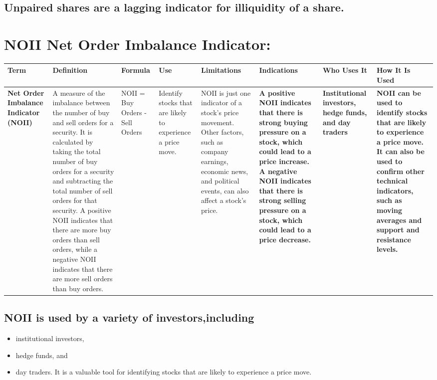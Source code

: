\documentclass[11pt]{article}
\begin{document}
\subsection{Unpaired shares are a lagging indicator for illiquidity of a share.}
\label{sec:org0ca7429}

\section{NOII Net Order Imbalance Indicator:}
\label{sec:org6dc8358}

\begin{center}
\begin{tabular}{llllllll}
\textbf{\textbf{Term}} & \textbf{\textbf{Definition}} & \textbf{\textbf{Formula}} & \textbf{\textbf{Use}} & \textbf{\textbf{Limitations}} & \textbf{\textbf{Indications}} & \textbf{\textbf{Who Uses It}} & \textbf{\textbf{How It Is Used}}\\[0pt]
\hline
\textbf{\textbf{Net Order Imbalance Indicator (NOII)}} & A measure of the imbalance between the number of buy and sell orders for a security. It is calculated by taking the total number of buy orders for a security and subtracting the total number of sell orders for that security. A positive NOII indicates that there are more buy orders than sell orders, while a negative NOII indicates that there are more sell orders than buy orders. & NOII = Buy Orders - Sell Orders & Identify stocks that are likely to experience a price move. & NOII is just one indicator of a stock's price movement. Other factors, such as company earnings, economic news, and political events, can also affect a stock's price. & \textbf{\textbf{A positive NOII indicates that there is strong buying pressure on a stock, which could lead to a price increase. A negative NOII indicates that there is strong selling pressure on a stock, which could lead to a price decrease.}} & \textbf{\textbf{Institutional investors, hedge funds, and day traders}} & \textbf{\textbf{NOII can be used to identify stocks that are likely to experience a price move. It can also be used to confirm other technical indicators, such as moving averages and support and resistance levels.}}\\[0pt]
\end{tabular}
\end{center}

\subsection{NOII is used by a variety of investors,including}
\label{sec:org129ccce}
\begin{itemize}
\item institutional investors,
\item hedge funds, and
\item day traders.
It is a valuable tool for identifying stocks that are likely to experience a price move.
\end{itemize}
\end{document}
